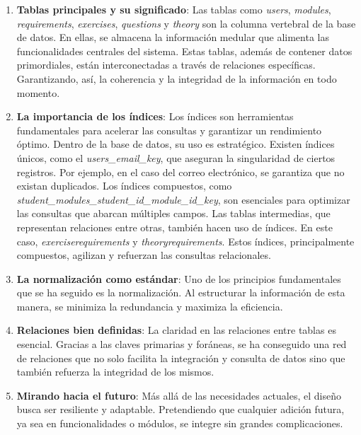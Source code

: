 \begin{enumerate}
    \item \textbf{Tablas principales y su significado}: Las tablas como \textit{users}, \textit{modules}, \textit{requirements}, \textit{exercises}, \textit{questions} y \textit{theory} son la columna vertebral de la base de datos. En ellas, se almacena la información medular que alimenta las funcionalidades centrales del sistema. Estas tablas, además de contener datos primordiales, están interconectadas a través de relaciones específicas. Garantizando, así, la coherencia y la integridad de la información en todo momento.
    
    \item  \textbf{La importancia de los índices}: Los índices son herramientas fundamentales para acelerar las consultas y garantizar un rendimiento óptimo. Dentro de la base de datos, su uso es estratégico. Existen índices únicos, como el \textit{users\_email\_key}, que aseguran la singularidad de ciertos registros. Por ejemplo, en el caso del correo electrónico, se garantiza que no existan duplicados. Los índices compuestos, como \textit{student\_modules\_student\_id\_module\_id\_key}, son esenciales para optimizar las consultas que abarcan múltiples campos. Las tablas intermedias, que representan relaciones entre otras, también hacen uso de índices. En este caso, \textit{exerciserequirements} y \textit{theoryrequirements}. Estos índices, principalmente compuestos, agilizan y refuerzan las consultas relacionales.

    \item \textbf{La normalización como estándar}: Uno de los principios fundamentales que se ha seguido es la normalización. Al estructurar la información de esta manera, se minimiza la redundancia y maximiza la eficiencia.

    \item \textbf{Relaciones bien definidas}: La claridad en las relaciones entre tablas es esencial. Gracias a las claves primarias y foráneas, se ha conseguido una red de relaciones que no solo facilita la integración y consulta de datos sino que también refuerza la integridad de los mismos.

    \item \textbf{Mirando hacia el futuro}: Más allá de las necesidades actuales, el diseño busca ser resiliente y adaptable. Pretendiendo que cualquier adición futura, ya sea en funcionalidades o módulos, se integre sin grandes complicaciones.
\end {enumerate}


